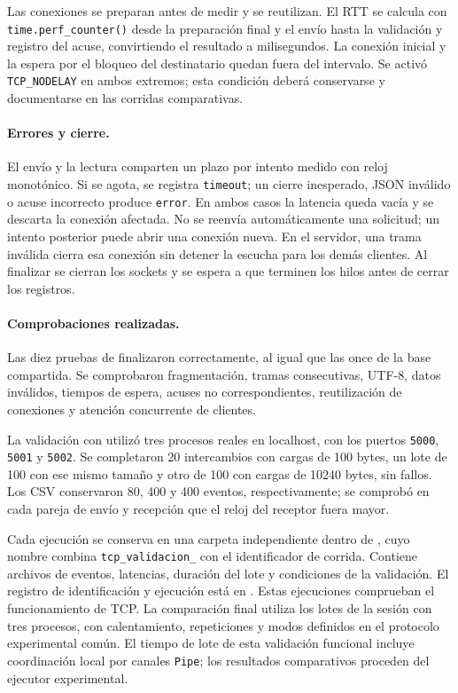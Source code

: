 Las conexiones se preparan antes de medir y se reutilizan. El RTT se calcula
con \texttt{time.perf\_counter()} desde la preparación final y el envío hasta
la validación y registro del acuse, convirtiendo el resultado a milisegundos.
La conexión inicial y la espera por el bloqueo del destinatario quedan fuera
del intervalo. Se activó \texttt{TCP\_NODELAY} en ambos extremos; esta condición
deberá conservarse y documentarse en las corridas comparativas.

\paragraph{Errores y cierre.}
El envío y la lectura comparten un plazo por intento medido con reloj monotónico.
Si se agota, se registra \texttt{timeout}; un cierre inesperado, JSON inválido o
acuse incorrecto produce \texttt{error}. En ambos casos la latencia queda vacía
y se descarta la conexión afectada. No se reenvía automáticamente una solicitud;
un intento posterior puede abrir una conexión nueva. En el servidor, una trama
inválida cierra esa conexión sin detener la escucha para los demás clientes.
Al finalizar se cierran los sockets y se espera a que terminen los hilos antes
de cerrar los registros.

\paragraph{Comprobaciones realizadas.}
Las diez pruebas de  finalizaron correctamente, al igual
que las once de la base compartida. Se comprobaron fragmentación, tramas
consecutivas, UTF-8, datos inválidos, tiempos de espera, acuses no correspondientes,
reutilización de conexiones y atención concurrente de clientes.

La validación con  utilizó tres procesos reales en
localhost, con los puertos \texttt{5000}, \texttt{5001} y \texttt{5002}. Se completaron
20 intercambios con cargas de 100 bytes, un lote de 100 con ese mismo tamaño
y otro de 100 con cargas de 10240 bytes, sin fallos. Los CSV conservaron
80, 400 y 400 eventos, respectivamente; se comprobó en cada pareja de envío
y recepción que el reloj del receptor fuera mayor.

Cada ejecución se conserva en una carpeta independiente dentro de ,
cuyo nombre combina \texttt{tcp\_validacion\_} con el identificador de corrida.
Contiene archivos de eventos, latencias,
duración del lote y condiciones de la validación. El registro de identificación
y ejecución está en
.
Estas ejecuciones comprueban el funcionamiento de TCP. La comparación final
utiliza los lotes de la sesión con tres procesos, con calentamiento, repeticiones
y modos definidos en el protocolo experimental común. El tiempo de lote de esta
validación funcional incluye coordinación local por canales \texttt{Pipe};
los resultados comparativos proceden del ejecutor experimental.
